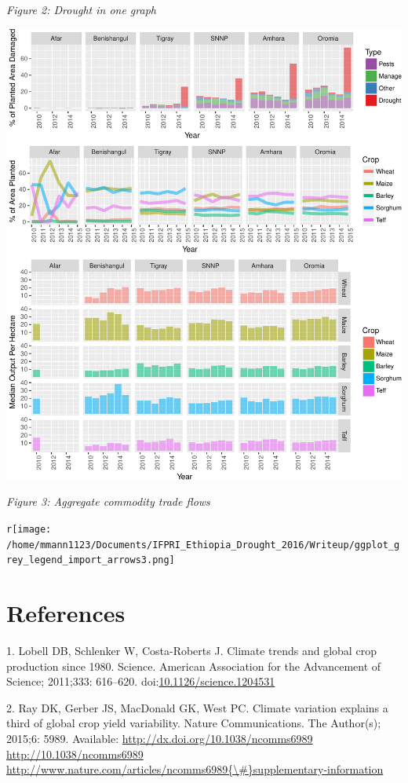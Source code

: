 \documentclass[10pt,letterpaper]{article}
\begin{document}
\newpage

\emph{Figure 2: Drought in one graph }

\includegraphics{IFPRI_2016_Report_Ethiopia_files/figure-latex/unnamed-chunk-2-1.pdf}

\pagebreak

\emph{Figure 3: Aggregate commodity trade flows }

\texttt{r}\texttt{[image: /home/mmann1123/Documents/IFPRI\_Ethiopia\_Drought\_2016/Writeup/ggplot\_grey\_legend\_import\_arrows3.png]}

\section*{References}\label{references}

\hypertarget{refs}{}
\hypertarget{ref-Lobell616}{}
1. Lobell DB, Schlenker W, Costa-Roberts J. Climate trends and global
crop production since 1980. Science. American Association for the
Advancement of Science; 2011;333: 616--620.
doi:\href{https://doi.org/10.1126/science.1204531}{10.1126/science.1204531}

\hypertarget{ref-Ray2015}{}
2. Ray DK, Gerber JS, MacDonald GK, West PC. Climate variation explains
a third of global crop yield variability. Nature Communications. The
Author(s); 2015;6: 5989. Available:
\href{http://dx.doi.org/10.1038/ncomms6989\%20http://10.1038/ncomms6989\%20http://www.nature.com/articles/ncomms6989\%7B/\#\%7Dsupplementary-information}{http://dx.doi.org/10.1038/ncomms6989 http://10.1038/ncomms6989 http://www.nature.com/articles/ncomms6989\{\textbackslash{}\#\}supplementary-information}
\end{document}
